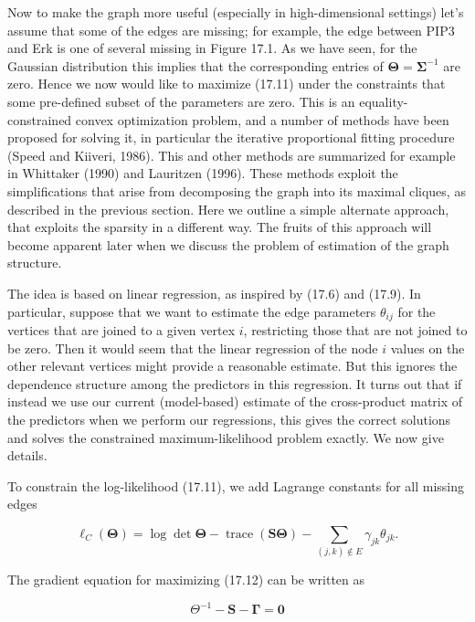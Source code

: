 \documentclass[10pt]{article}
\begin{document}
Now to make the graph more useful (especially in high-dimensional settings) let's assume that some of the edges are missing; for example, the edge between PIP3 and Erk is one of several missing in Figure 17.1. As we have seen, for the Gaussian distribution this implies that the corresponding entries of $\boldsymbol{\Theta}=\boldsymbol{\Sigma}^{-1}$ are zero. Hence we now would like to maximize (17.11) under the constraints that some pre-defined subset of the parameters are zero. This is an equality-constrained convex optimization problem, and a number of methods have been proposed for solving it, in particular the iterative proportional fitting procedure (Speed and Kiiveri, 1986). This and other methods are summarized for example in Whittaker (1990) and Lauritzen (1996). These methods exploit the simplifications that arise from decomposing the graph into its maximal cliques, as described in the previous section. Here we outline a simple alternate approach, that exploits the sparsity in a different way. The fruits of this approach will become apparent later when we discuss the problem of estimation of the graph structure.

The idea is based on linear regression, as inspired by (17.6) and (17.9). In particular, suppose that we want to estimate the edge parameters $\theta_{i j}$ for the vertices that are joined to a given vertex $i$, restricting those that are not joined to be zero. Then it would seem that the linear regression of the node $i$ values on the other relevant vertices might provide a reasonable estimate. But this ignores the dependence structure among the predictors in this regression. It turns out that if instead we use our current (model-based) estimate of the cross-product matrix of the predictors when we perform our regressions, this gives the correct solutions and solves the constrained maximum-likelihood problem exactly. We now give details.

To constrain the log-likelihood (17.11), we add Lagrange constants for all missing edges


\begin{equation*}
\ell_{C}(\boldsymbol{\Theta})=\log \operatorname{det} \boldsymbol{\Theta}-\operatorname{trace}(\mathbf{S} \boldsymbol{\Theta})-\sum_{(j, k) \notin E} \gamma_{j k} \theta_{j k} . \tag{17.12}
\end{equation*}


The gradient equation for maximizing (17.12) can be written as


\begin{equation*}
\Theta^{-1}-\mathbf{S}-\mathbf{\Gamma}=\mathbf{0} \tag{17.13}
\end{equation*}
\end{document}
